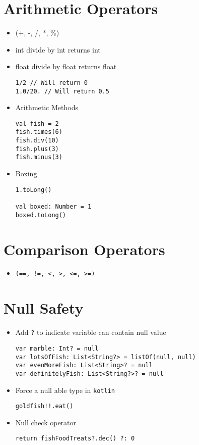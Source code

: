 \documentclass[11pt]{article}
\begin{document}
\section*{Arithmetic Operators}
\label{sec:orgb6a1b84}
\begin{itemize}
\item (+, -, /, *, \%)
\item int divide by int returns int
\item float divide by float returns float
\begin{verbatim}
1/2 // Will return 0
1.0/20. // Will return 0.5
\end{verbatim}
\item Arithmetic Methods
\begin{verbatim}
val fish = 2
fish.times(6)
fish.div(10)
fish.plus(3)
fish.minus(3)
\end{verbatim}
\item Boxing
\begin{verbatim}
1.toLong()

val boxed: Number = 1
boxed.toLong()
\end{verbatim}
\end{itemize}
\section*{Comparison Operators}
\label{sec:org35be737}
\begin{itemize}
\item \texttt{(==, !=, <, >, <=, >=)}
\end{itemize}

\section*{Null Safety}
\label{sec:org1545b3e}
\begin{itemize}
\item Add \texttt{?} to indicate variable can contain null value
\begin{verbatim}
var marble: Int? = null
var lotsOfFish: List<String?> = listOf(null, null)
var evenMoreFish: List<String>? = null
var definitelyFish: List<String?>? = null
\end{verbatim}
\item Force a null able type in \texttt{kotlin}
\begin{verbatim}
goldfish!!.eat()
\end{verbatim}
\item Null check operator
\begin{verbatim}
return fishFoodTreats?.dec() ?: 0
\end{verbatim}
\end{itemize}
\end{document}
